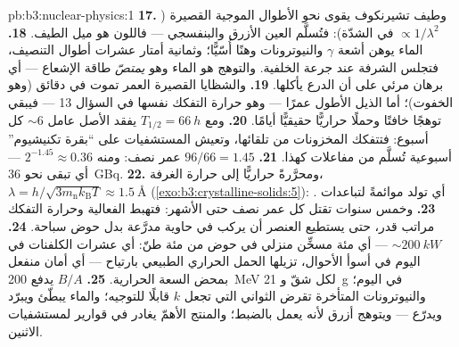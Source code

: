 \begin{solution}{pb:b3:nuclear-physics:1}
\textbf{17.} وطيف تشيرنكوف يقوى نحو الأطوال الموجية
القصيرة ($\propto1/\lambda^2$ في الشدّة): فتُسلَّم العين
الأزرق والبنفسجي --- فاللون هو ميل الطيف.
\textbf{18.} الماء يوهن أشعة $\gamma$ والنيوترونات
وهنًا أُسّيًّا؛ وثمانية أمتار عشرات أطوال التنصيف، فتجلس
الشرفة عند جرعة الخلفية. والتوهج هو الماء وهو
\emph{يمتصّ} طاقة الإشعاع --- أي برهان مرئي على أن
الدرع يأكلها.
\textbf{19.} والشظايا القصيرة العمر تموت في دقائق
(وهو الخفوت)؛ أما الذيل الأطول عمرًا --- وهو حرارة التفكك نفسها في
السؤال 13 --- فيبقي توهجًا خافتًا وحملًا حراريًّا حقيقيًّا
أيامًا.
\textbf{20.} ومع $T_{1/2} = \qty{66}{h}$ يفقد الأصل
عامل ${\sim}6$ كل أسبوع: فتتفكك المخزونات من تلقائها،
وتعيش المستشفيات على ``بقرة تكنيشيوم'' أسبوعية تُسلَّم من
مفاعلات كهذا.
\textbf{21.} $96/66 = 1.45$ عمر نصف: ومنه $2^{-1.45} \approx
0.36$ --- أي تبقى نحو \qty{36}{GBq}.
\textbf{22.} ومحرَّرةً حراريًّا إلى حرارة الغرفة، $\lambda =
h/\sqrt{3m_{\text{n}}k_{\text{B}}T} \approx \qty{1.5}{\angstrom}$
(\cref{exo:b3:crystalline-solids:5}): أي تولد موائمةً لتباعدات
.
\textbf{23.} وخمس سنوات تقتل كل عمر نصف حتى الأشهر:
فتهبط الفعالية وحرارة التفكك مراتب قدر، حتى يستطيع
العنصر أن يركب في حاوية مدرَّعة بدل حوض سباحة.
\textbf{24.} ${\sim}\qty{200}{kW}$ --- أي مئة مسخِّن
منزلي في حوض من مئة طنّ: أي عشرات الكلفنات في اليوم في
أسوأ الأحوال، تزيلها الحمل الحراري الطبيعي بارتياح --- أي أمان
منفعل بمحض السعة الحرارية.
\textbf{25.} $B/A$ يدفع \qty{200}{MeV} لكل شقّ و \qty{21}{g}
في اليوم؛ والنيوترونات المتأخرة تقرض الثواني التي تجعل $k$
قابلًا للتوجيه؛ والماء يبطّئ ويبرّد ويدرّع --- ويتوهج
أزرق لأنه يعمل بالضبط؛ والمنتج الأهمّ
يغادر في قوارير لمستشفيات الاثنين.
\end{solution}
